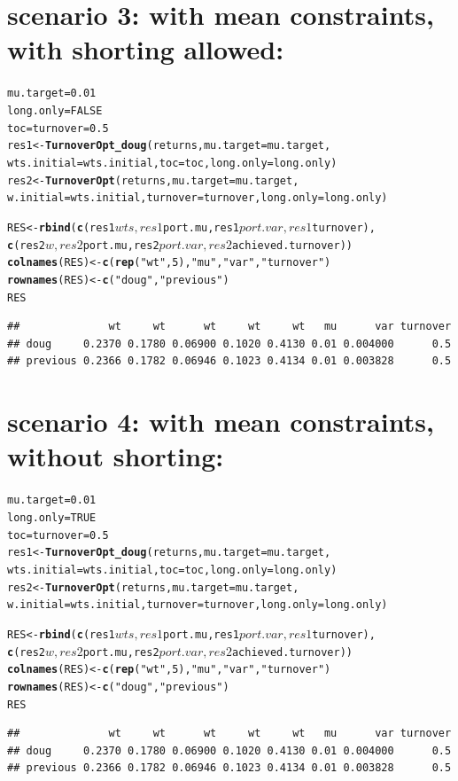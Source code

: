 \documentclass{uwstat518}\usepackage[]{graphicx}\usepackage[]{color}
\makeatletter
\newcommand{\hlstr}[1]{\textcolor[rgb]{0.192,0.494,0.8}{#1}}%
\newcommand{\hlkwd}[1]{\textcolor[rgb]{0.737,0.353,0.396}{\textbf{#1}}}%
\newenvironment{kframe}{%
 \def\at@end@of@kframe{}%
 \ifinner\ifhmode%
  \def\at@end@of@kframe{\end{minipage}}%
  \begin{minipage}{\columnwidth}%
 \fi\fi%
 \def\FrameCommand##1{\hskip\@totalleftmargin \hskip-\fboxsep
 \colorbox{shadecolor}{##1}\hskip-\fboxsep
     \hskip-\linewidth \hskip-\@totalleftmargin \hskip\columnwidth}%
 \MakeFramed {\advance\hsize-\width
   \@totalleftmargin\z@ \linewidth\hsize
   \@setminipage}}%
 {\par\unskip\endMakeFramed%
 \at@end@of@kframe}
\newenvironment{knitrout}{}{} %
\makeatother
\begin{document}
\section{scenario 3: with mean constraints, with shorting allowed:}
\begin{knitrout}
\color{fgcolor}\begin{kframe}
\begin{alltt}
mu.target = 0.01
long.only = FALSE
toc=turnover=0.5
res1 <- \hlkwd{TurnoverOpt_doug}(returns, mu.target =mu.target, 
		wts.initial = wts.initial, toc = toc, long.only=long.only)
res2 <- \hlkwd{TurnoverOpt}(returns,mu.target=mu.target, 
		w.initial=wts.initial,turnover=turnover,long.only=long.only)

RES <- \hlkwd{rbind}(\hlkwd{c}(res1$wts,res1$port.mu,res1$port.var,res1$turnover),
		\hlkwd{c}(res2$w,res2$port.mu, res2$port.var, res2$achieved.turnover))
\hlkwd{colnames}(RES) <- \hlkwd{c}(\hlkwd{rep}(\hlstr{"wt"},5),\hlstr{"mu"},\hlstr{"var"},\hlstr{"turnover"})
\hlkwd{rownames}(RES) <- \hlkwd{c}(\hlstr{"doug"},\hlstr{"previous"})
RES	
\end{alltt}
\begin{verbatim}
##              wt     wt      wt     wt     wt   mu      var turnover
## doug     0.2370 0.1780 0.06900 0.1020 0.4130 0.01 0.004000      0.5
## previous 0.2366 0.1782 0.06946 0.1023 0.4134 0.01 0.003828      0.5
\end{verbatim}
\end{kframe}
\end{knitrout}



\section{scenario 4: with mean constraints, without shorting: }
\begin{knitrout}
\color{fgcolor}\begin{kframe}
\begin{alltt}
mu.target = 0.01
long.only = TRUE
toc=turnover=0.5
res1 <- \hlkwd{TurnoverOpt_doug}(returns, mu.target =mu.target, 
		wts.initial = wts.initial, toc = toc, long.only=long.only)
res2 <- \hlkwd{TurnoverOpt}(returns,mu.target=mu.target, 
		w.initial=wts.initial,turnover=turnover,long.only=long.only)

RES <- \hlkwd{rbind}(\hlkwd{c}(res1$wts,res1$port.mu,res1$port.var,res1$turnover), 
		\hlkwd{c}(res2$w,res2$port.mu, res2$port.var, res2$achieved.turnover))
\hlkwd{colnames}(RES) <- \hlkwd{c}(\hlkwd{rep}(\hlstr{"wt"},5),\hlstr{"mu"},\hlstr{"var"},\hlstr{"turnover"})
\hlkwd{rownames}(RES) <- \hlkwd{c}(\hlstr{"doug"},\hlstr{"previous"})
RES	
\end{alltt}
\begin{verbatim}
##              wt     wt      wt     wt     wt   mu      var turnover
## doug     0.2370 0.1780 0.06900 0.1020 0.4130 0.01 0.004000      0.5
## previous 0.2366 0.1782 0.06946 0.1023 0.4134 0.01 0.003828      0.5
\end{verbatim}
\end{kframe}
\end{knitrout}
\end{document}
